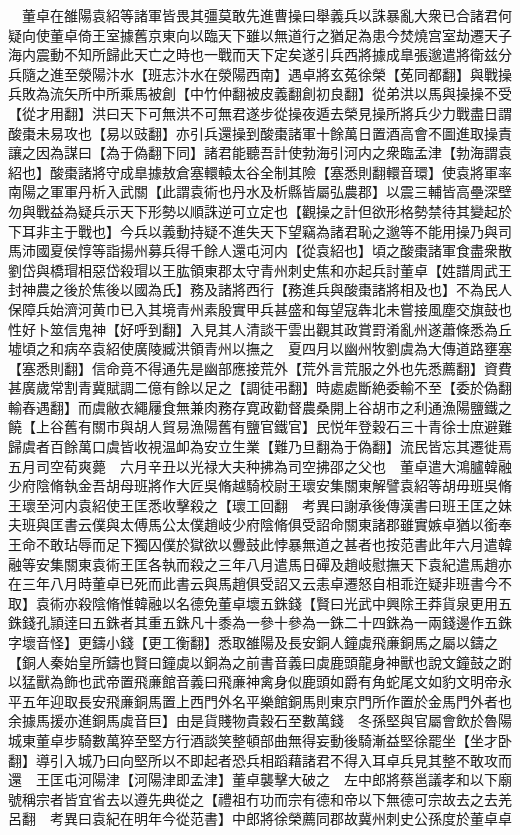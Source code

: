 　董卓在雒陽袁紹等諸軍皆畏其彊莫敢先進曹操曰舉義兵以誅暴亂大衆已合諸君何疑向使董卓倚王室據舊京東向以臨天下雖以無道行之猶足為患今焚燒宫室劫遷天子海内震動不知所歸此天亡之時也一戰而天下定矣遂引兵西將據成臯張邈遣將衛兹分兵隨之進至滎陽汴水【班志汴水在滎陽西南】遇卓將玄菟徐榮【莬同都翻】與戰操兵敗為流矢所中所乘馬被創【中竹仲翻被皮義翻創初良翻】從弟洪以馬與操操不受【從才用翻】洪曰天下可無洪不可無君遂步從操夜遁去榮見操所將兵少力戰盡日謂酸棗未易攻也【易以豉翻】亦引兵還操到酸棗諸軍十餘萬日置酒高會不圖進取操責讓之因為謀曰【為于偽翻下同】諸君能聽吾計使勃海引河内之衆臨孟津【勃海謂袁紹也】酸棗諸將守成臯據敖倉塞轘轅太谷全制其險【塞悉則翻轘音環】使袁將軍率南陽之軍軍丹析入武關【此謂袁術也丹水及析縣皆屬弘農郡】以震三輔皆高壘深壁勿與戰益為疑兵示天下形勢以順誅逆可立定也【觀操之計但欲形格勢禁待其變起於下耳非主于戰也】今兵以義動持疑不進失天下望竊為諸君恥之邈等不能用操乃與司馬沛國夏侯惇等詣揚州募兵得千餘人還屯河内【從袁紹也】頃之酸棗諸軍食盡衆散劉岱與橋瑁相惡岱殺瑁以王肱領東郡太守青州刺史焦和亦起兵討董卓【姓譜周武王封神農之後於焦後以國為氏】務及諸將西行【務進兵與酸棗諸將相及也】不為民人保障兵始濟河黄巾已入其境青州素殷實甲兵甚盛和每望寇犇北未嘗接風塵交旗鼓也性好卜筮信鬼神【好呼到翻】入見其人清談干雲出觀其政賞罸淆亂州遂蕭條悉為丘墟頃之和病卒袁紹使廣陵臧洪領青州以撫之　夏四月以幽州牧劉虞為大傳道路壅塞【塞悉則翻】信命竟不得通先是幽部應接荒外【荒外言荒服之外也先悉薦翻】資費甚廣歲常割青冀賦調二億有餘以足之【調徒弔翻】時處處斷絶委輸不至【委於偽翻輸舂遇翻】而虞敝衣繩屨食無兼肉務存寛政勸督農桑開上谷胡市之利通漁陽鹽鐵之饒【上谷舊有關市與胡人貿易漁陽舊有鹽官鐵官】民悦年登穀石三十青徐士庶避難歸虞者百餘萬口虞皆收視温卹為安立生業【難乃旦翻為于偽翻】流民皆忘其遷徙焉　五月司空荀爽薨　六月辛丑以光禄大夫种拂為司空拂邵之父也　董卓遣大鴻臚韓融少府陰脩執金吾胡母班將作大匠吳脩越騎校尉王瓌安集關東解譬袁紹等胡毋班吳脩王瓌至河内袁紹使王匡悉收擊殺之【瓌工回翻　考異曰謝承後傳漢書曰班王匡之妹夫班與匡書云僕與太傅馬公太僕趙岐少府陰脩俱受詔命關東諸郡雖實嫉卓猶以銜奉王命不敢玷辱而足下獨囚僕於獄欲以釁鼓此悖暴無道之甚者也按范書此年六月遣韓融等安集關東袁術王匡各執而殺之三年八月遣馬日磾及趙岐慰撫天下袁紀遣馬趙亦在三年八月時董卓已死而此書云與馬趙俱受詔又云恚卓遷怒自相乖迕疑非班書今不取】袁術亦殺陰脩惟韓融以名德免董卓壞五銖錢【賢曰光武中興除王莽貨泉更用五銖錢孔頴逹曰五銖者其重五銖凡十黍為一參十參為一銖二十四銖為一兩錢邊作五銖字壞音怪】更鑄小錢【更工衡翻】悉取雒陽及長安銅人鐘虡飛亷銅馬之屬以鑄之【銅人秦始皇所鑄也賢曰鐘虡以銅為之前書音義曰虡鹿頭龍身神獸也說文鐘鼓之跗以猛獸為飾也武帝置飛亷館音義曰飛亷神禽身似鹿頭如爵有角蛇尾文如豹文明帝永平五年迎取長安飛亷銅馬置上西門外名平樂館銅馬則東京門所作置於金馬門外者也余據馬援亦進銅馬虡音巨】由是貨賤物貴穀石至數萬錢　冬孫堅與官屬會飲於魯陽城東董卓步騎數萬猝至堅方行酒談笑整頓部曲無得妄動後騎漸益堅徐罷坐【坐才卧翻】導引入城乃曰向堅所以不即起者恐兵相蹈藉諸君不得入耳卓兵見其整不敢攻而還　王匡屯河陽津【河陽津即孟津】董卓襲擊大破之　左中郎將蔡邕議孝和以下廟號稱宗者皆宜省去以遵先典從之【禮祖冇功而宗有德和帝以下無德可宗故去之去羌呂翻　考異曰袁紀在明年今從范書】中郎將徐榮薦同郡故冀州刺史公孫度於董卓卓

